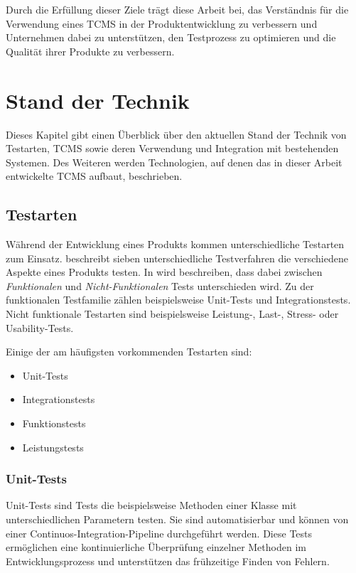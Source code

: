 \documentclass[a4paper, fontsize=11pt, parskip=half, twoside]{scrreprt}
\begin{document}
	Durch die Erfüllung dieser Ziele trägt diese Arbeit bei, das Verständnis für die Verwendung eines \ac{TCMS} in der Produktentwicklung zu verbessern und Unternehmen dabei zu unterstützen, den Testprozess zu optimieren und die Qualität ihrer Produkte zu verbessern.
	
	
	
	\chapter{Stand der Technik}
	Dieses Kapitel gibt einen Überblick über den aktuellen Stand der Technik von Testarten, \ac{TCMS} sowie deren Verwendung und Integration mit bestehenden Systemen. 
	Des Weiteren werden Technologien, auf denen das in dieser Arbeit entwickelte \ac{TCMS} aufbaut, beschrieben.
	
	\section{Testarten} \label{sec:testtypes}
	Während der Entwicklung eines Produkts kommen unterschiedliche Testarten zum Einsatz. 
	\textcite{atlassian_unterschiedlichen_nodate} beschreibt sieben unterschiedliche Testverfahren die verschiedene Aspekte eines Produkts testen.
	In \textcite{noauthor_software_nodate} wird beschreiben, dass dabei zwischen \emph{Funktionalen} und \emph{Nicht-Funktionalen} Tests unterschieden wird.
	Zu der funktionalen Testfamilie zählen beispielsweise Unit-Tests und Integrationstests.
	Nicht funktionale Testarten sind beispielsweise Leistung-, Last-, Stress- oder Usability-Tests.
	
	Einige der am häufigsten vorkommenden Testarten sind:
	
	\begin{itemize}
		\item Unit-Tests
		\item Integrationstests
		\item Funktionstests
		\item Leistungstests
	\end{itemize}
	
	\subsection{Unit-Tests}
	Unit-Tests sind Tests die beispielsweise Methoden einer Klasse mit unterschiedlichen Parametern testen. 
	Sie sind automatisierbar und können von einer Continuos-Integration-Pipeline durchgeführt werden. 
	Diese Tests ermöglichen eine kontinuierliche Überprüfung einzelner Methoden im Entwicklungsprozess und unterstützen das frühzeitige Finden von Fehlern.
	
\end{document}
